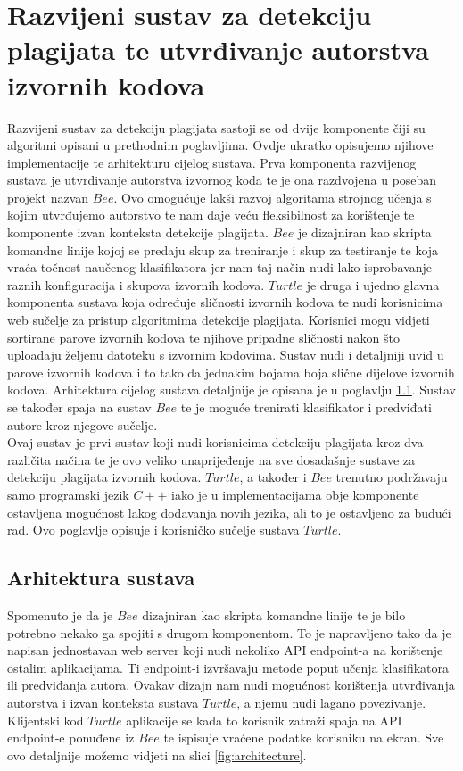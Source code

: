 \chapter{Razvijeni sustav za detekciju plagijata te utvrđivanje autorstva izvornih kodova}

Razvijeni sustav za detekciju plagijata sastoji se od dvije komponente čiji su  algoritmi opisani u prethodnim poglavljima. Ovdje ukratko opisujemo njihove implementacije te arhitekturu cijelog sustava. Prva komponenta razvijenog sustava je utvrđivanje autorstva izvornog koda te je ona razdvojena u poseban projekt nazvan $Bee$. Ovo omogućuje lakši razvoj algoritama strojnog učenja s kojim utvrđujemo autorstvo te nam daje veću fleksibilnost za korištenje te komponente izvan konteksta detekcije plagijata. $Bee$ je dizajniran kao skripta komandne linije kojoj se predaju skup za treniranje i skup za testiranje te koja vraća točnost naučenog klasifikatora jer nam taj način nudi lako isprobavanje raznih konfiguracija i skupova izvornih kodova. $Turtle$ je druga i ujedno glavna komponenta sustava koja određuje sličnosti izvornih kodova te nudi korisnicima web sučelje za pristup algoritmima detekcije plagijata. Korisnici mogu vidjeti sortirane parove izvornih kodova te njihove pripadne sličnosti nakon što uploadaju željenu datoteku s izvornim kodovima. Sustav nudi i detaljniji uvid u parove izvornih kodova i to tako da jednakim bojama boja slične dijelove izvornih kodova. Arhitektura cijelog sustava detaljnije je opisana je u poglavlju \ref{sec:architecture}. Sustav se također spaja na sustav $Bee$ te je moguće trenirati klasifikator i predviđati autore kroz njegove sučelje. 
\\

	Ovaj sustav je prvi sustav koji nudi korisnicima detekciju plagijata kroz dva različita načina te je ovo veliko unaprijeđenje na sve dosadašnje sustave za detekciju plagijata izvornih kodova. $Turtle$, a također i $Bee$ trenutno podržavaju samo programski jezik $C++$ iako je u implementacijama obje komponente ostavljena mogućnost lakog dodavanja novih jezika, ali to je ostavljeno za budući rad. Ovo poglavlje opisuje i korisničko sučelje sustava $Turtle$.


\section{Arhitektura sustava} \label{sec:architecture}
Spomenuto je da je $Bee$ dizajniran kao skripta komandne linije te je bilo potrebno nekako ga spojiti s drugom komponentom. To je napravljeno tako da je napisan jednostavan web server koji nudi nekoliko API endpoint-a na korištenje ostalim aplikacijama. Ti endpoint-i izvršavaju metode poput učenja klasifikatora ili predviđanja autora. Ovakav dizajn nam nudi mogućnost korištenja utvrđivanja autorstva i izvan konteksta sustava $Turtle$, a njemu nudi lagano povezivanje. Klijentski kod $Turtle$ aplikacije se kada to korisnik zatraži spaja na API endpoint-e ponuđene iz $Bee$ te ispisuje vraćene podatke korisniku na ekran. Sve ovo detaljnije možemo vidjeti na slici \ref{fig:architecture}.


